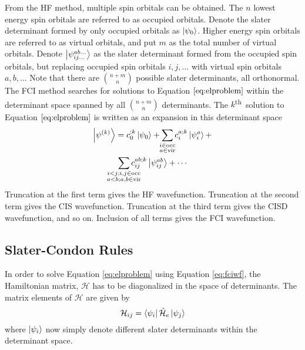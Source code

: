 \documentclass[final,3p,times,twocolumn]{elsarticle}
\newcommand{\ssth}{\textsuperscript{th}}
\newcommand{\ham}{\hat{\mathcal{H}}}
\begin{document}
From the HF method,\cite{roothaan} multiple spin orbitals can be obtained. The $n$ lowest energy spin orbitals are referred to as occupied orbitals. Denote the slater determinant formed by only occupied orbitals as $\ket{\psi_0}$. Higher energy spin orbitals are referred to as virtual orbitals, and put $m$ as the total number of virtual orbitals. Denote $\ket{\psi_{ij\ldots}^{ab\ldots}}$ as the slater determinant formed from the occupied spin orbitals, but replacing occupied spin orbitals $i, j, \ldots$ with virtual spin orbitals $a, b, \ldots$ Note that there are $\binom{n+m}{n}$ possible slater determinants, all orthonormal. The FCI method searches for solutions to Equation $\ref{eq:elproblem}$ within the determinant space spanned by all $\binom{n+m}{n}$ determinants. The $k$\ssth\ solution to Equation $\eqref{eq:elproblem}$ is written as an expansion in this determinant space
\begin{equation}\label{eq:fciwf}
\begin{gathered}
\ket{\psi^{(k)}} = c_0^{;k}\ket{\psi_0} + \sum_{\mathclap{\substack{i\in\text{occ} \\ a \in\text{vir}}}} c_i^{a;k}\ket{\psi_i^a} + \\
\sum_{\mathclap{\substack{i < j; i, j \in\text{occ} \\ a < b; a, b \in\text{vir}}}} c_{ij}^{ab;k}\ket{\psi_{ij}^{ab}} 
+ \cdots
\end{gathered}
\end{equation}
Truncation at the first term gives the HF wavefunction. Truncation at the second term gives the CIS wavefunction. Truncation at the third term gives the CISD wavefunction, and so on. Inclusion of all terms gives the FCI wavefunction.

\subsection{Slater-Condon Rules} \label{sec:condonrules}
In order to solve Equation \eqref{eq:elproblem} using Equation \eqref{eq:fciwf}, the Hamiltonian matrix, $\mathcal H$ has to be diagonalized in the space of determinants. The matrix elements of $\mathcal H$ are given by
\begin{equation} \label{eq:hmat}
\mathcal H_{ij} = \bra{\psi_i}\ham_e\ket{\psi_j}
\end{equation}
where $\ket{\psi_i}$ now simply denote different slater determinants within the determinant space.
\end{document}
